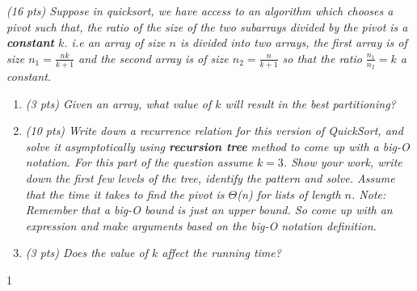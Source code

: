 \documentclass[9pt]{article}
\def\solutions{1}
\begin{document}
\item {\itshape (16 pts) Suppose in quicksort, we have access to an algorithm which chooses a pivot such that, the ratio of the size of the two subarrays divided by the pivot is a \textbf{constant} $k$. i.e an array of size $n$ is divided into two arrays, the first array is of size $n_1 = \frac{nk}{k+1}$ and the second array is of size $n_2 = \frac{n}{k+1}$ so that the ratio $\frac{n_1}{n_2} = k$ a constant. 
	}
	\begin{enumerate}%
	
	\item{\itshape
    (3 pts) Given an array, what value of $k$ will result in the best partitioning?}
    
    \item{\itshape
    (10 pts) Write down a recurrence relation for this version of QuickSort, and solve it asymptotically using \textbf{recursion tree} method to come up with a big-O notation. For this part of the question assume $k= 3$. Show your work, write down the first few levels of the tree, identify the pattern and solve. Assume that the time it takes to find the pivot is $\Theta$(n) for lists of length $n$. Note: Remember that a big-O bound is just an upper bound. So come up with an expression and make arguments based on the big-O notation definition. }
	
	\item{ \itshape
(3 pts) Does the value of $k$ affect the running time?}
		\end{enumerate}
  \if\solutions1
  \vspace{2mm}
  
\end{document}
